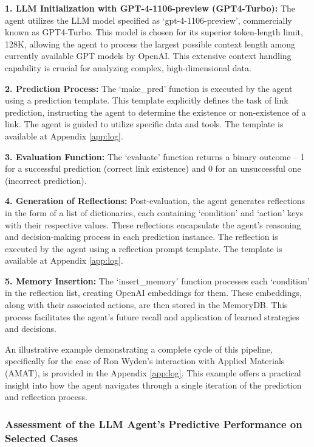 \documentclass[15pt,letterpaper]{article}
\begin{document}
\textbf{1. LLM Initialization with GPT-4-1106-preview (GPT4-Turbo):} The agent utilizes the LLM model specified as `gpt-4-1106-preview', commercially known as GPT4-Turbo. This model is chosen for its superior token-length limit, 128K, allowing the agent to process the largest possible context length among currently available GPT models by OpenAI. This extensive context handling capability is crucial for analyzing complex, high-dimensional data.

\textbf{2. Prediction Process:} The `make\_pred' function is executed by the agent using a prediction template. This template explicitly defines the task of link prediction, instructing the agent to determine the existence or non-existence of a link. The agent is guided to utilize specific data and tools. The template is available at Appendix \ref{app:log}.

\textbf{3. Evaluation Function:} The `evaluate' function returns a binary outcome – 1 for a successful prediction (correct link existence) and 0 for an unsuccessful one (incorrect prediction).

\textbf{4. Generation of Reflections:} Post-evaluation, the agent generates reflections in the form of a list of dictionaries, each containing `condition' and `action' keys with their respective values. These reflections encapsulate the agent's reasoning and decision-making process in each prediction instance.
The reflection is executed by the agent using a reflection prompt template. The template is available at Appendix \ref{app:log}.

\textbf{5. Memory Insertion:} The `insert\_memory' function processes each `condition' in the reflection list, creating OpenAI embeddings for them. These embeddings, along with their associated actions, are then stored in the MemoryDB. This process facilitates the agent’s future recall and application of learned strategies and decisions.

An illustrative example demonstrating a complete cycle of this pipeline, specifically for the case of Ron Wyden's interaction with Applied Materials (AMAT), is provided in the Appendix \ref{app:log}. This example offers a practical insight into how the agent navigates through a single iteration of the prediction and reflection process.

\subsubsection{Assessment of the LLM Agent's Predictive Performance on Selected Cases}
\end{document}
